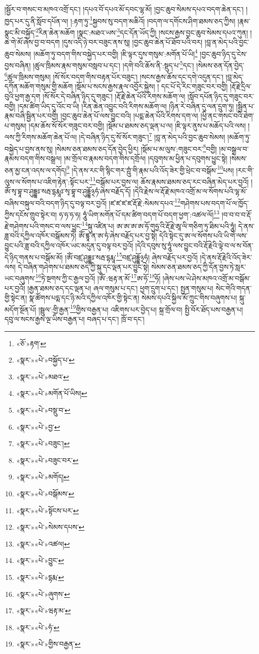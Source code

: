 །སྦྱོར་བ་གསང་བ་མཁའ་འགྲོ་དང་། །དཔའ་བོ་དཔའ་མོ་དབང་ལྷ་མོ། །བྱང་ཆུབ་སེམས་དཔའ་བདག་ཆེན་དང་། །ཁྱད་པར་དུ་ནི་སློབ་དཔོན་ལ། །:རྟག་ཏུ་\footnote{«ཅོ་»རྟག་}སྐྱབས་སུ་བདག་མཆིའོ། །བདག་ལ་དགོངས་ཤིག་ཐམས་ཅད་ཀྱིས། །རྣམ་སྣང་མི་བསྐྱོད་\footnote{«སྣར་»«པེ་»བསྐྱོད་པ་}རིན་ཆེན་མཆོག །སྣང་:མཐའ་ཡས་\footnote{«སྣར་»«པེ་»མཐའ་}དང་དོན་ཡོད་ཀྱི། །སངས་རྒྱས་བྱང་ཆུབ་སེམས་དཔའ་ཀུན། །ཆེ་གེ་མོ་ཞེས་བྱ་བ་བདག །དུས་འདི་ཉེ་བར་བཟུང་ནས་སུ། །བྱང་ཆུབ་ཆེན་པོ་ཐོབ་པའི་བར། །བླ་ན་མེད་པའི་བྱང་ཆུབ་སེམས། །མཆོག་ཏུ་བདག་གིས་བསྐྱེད་པར་བགྱི། །ཇི་ལྟར་དུས་གསུམ་:མགོན་པོ་ཡི།\footnote{«སྣར་»«པེ་»མགོན་པོ་ཡིས།} །བྱང་ཆུབ་ཉིད་དུ་ངེས་བྱས་བཞིན། །ཚུལ་ཁྲིམས་རྣམ་གསུམ་བསླབ་པ་དང་། །དགེ་བའི་ཆོས་ནི་:སྡུད་པ་\footnote{«སྣར་»«པེ་»བསྡུ་བ་}དང་། །སེམས་ཅན་དོན་བྱེད་\footnote{«སྣར་»«པེ་»བྱ་}ཚུལ་ཁྲིམས་གསུམ། །སོ་སོར་བདག་གིས་བརྟན་པོར་བཟུང་། །སངས་རྒྱས་ཆོས་དང་དགེ་འདུན་དང་། །བླ་མེད་དཀོན་མཆོག་གསུམ་གྱི་མཆོག །སྡོམ་པ་སངས་རྒྱས་རྣལ་འབྱོར་སྐྱེས། །
དང་པོ་དེ་རིང་གཟུང་བར་བགྱི། །རྡོ་རྗེ་དྲིལ་བུའི་ཕྱག་རྒྱ་དག །སོ་སོར་དེ་བཞིན་ཉིད་དུ་གཟུང་། །རྡོ་རྗེ་ཆེན་པོའི་རིགས་མཆོག་ལ། །སློབ་དཔོན་ཉིད་དུ་གཟུང་བར་བགྱི། །དམ་ཚིག་ཡིད་དུ་འོང་བ་ཡི། །རིན་ཆེན་འབྱུང་བའི་རིགས་མཆོག་ལ། །ཉིན་རེ་བཞིན་དུ་ལན་དྲུག་ཏུ། །སྦྱིན་པ་རྣམ་བཞི་སྦྱིན་པར་བགྱི། །བྱང་ཆུབ་ཆེན་པོ་ལས་བྱུང་བའི། །པདྨ་ཆེན་པོའི་རིགས་དག་ལ། །ཕྱི་ནང་གསང་བའི་ཐེག་པ་གསུམ། །དམ་ཆོས་སོ་སོར་གཟུང་བར་བགྱི། །སྡོམ་པ་ཐམས་ཅད་ལྡན་པ་ལ། །ཇི་ལྟར་ནུས་པ་མཆོད་པའི་ལས། །ལས་ཀྱི་རིགས་མཆོག་ཆེན་པོ་ལ། །དེ་བཞིན་ཉིད་དུ་སོ་སོར་གཟུང་།\footnote{«སྣར་»«པེ་»བཟུང་།} །བླ་ན་མེད་པའི་བྱང་ཆུབ་སེམས། །མཆོག་ཏུ་བསྐྱེད་པ་བྱས་ནས་སུ། །སེམས་ཅན་ཐམས་ཅད་དོན་བྱེད་ཕྱིར། །སྡོམ་པ་མ་ལུས་:གཟུང་བར་\footnote{«སྣར་»«པེ་»བཟུང་བར་}བགྱི། །མ་བསྒྲལ་བ་རྣམས་བདག་གིས་བསྒྲལ། །མ་གྲོལ་བ་རྣམས་བདག་གིས་དགྲོལ། །དབུགས་མ་ཕྱིན་པ་དབུགས་ཕྱུང་སྟེ། །སེམས་ཅན་མྱ་ངན་འདས་ལ་དགོད།\footnote{«སྣར་»«པེ་»མགོད།} །དེ་ནས་རང་གི་སྙིང་གར་ཀྵུཾ་གི་རྣམ་པའི་འོད་ཟེར་གྱི་ཕྲེང་བ་བསྒོམ་\footnote{«སྣར་»«པེ་»བསྒོམས་}པས། །རང་གི་ལུས་ལ་སོགས་པ་འཇིག་རྟེན་:སྟོང་པར་\footnote{«སྣར་»«པེ་»སྟོངས་པར་}བསྒོམ་པར་བྱས་ལ། ཆོས་རྣམས་ཐམས་ཅད་རང་བཞིན་མེད་པར་བྱའོ། །ཨོཾ་སྭ་བྷཱ་བ་ཤུདྡྷཿ་སརྦ་དྷརྨཱཿ་སྭ་བྷཱ་བ་ཤུདྡྷོ྅ཧཾ་ཞེས་བརྗོད་དོ། །དེའི་རྗེས་ལ་རྡོ་རྗེ་མཁའ་འགྲོ་མ་ལ་སོགས་པའི་ལྷ་མོ་བཞིས་བསྐུལ་བའི་བདག་ཉིད་དུ་བལྟ་བར་བྱའོ། །ཛ་ཛ་ཛ་ཛ་རྡོ་རྗེ་:སེམས་དཔའ་\footnote{«སྣར་»«པེ་»སེམས་དཔས་}གཤེགས་པས་བདག་པོ་ལ་ཁྱོད་ཀྱིས་དངོས་གྲུབ་སྟེར་བ། ཧ་ཧ་ཧ་ཧ། ཧཱུཾ་ཡིག་མགོན་པོ་དམ་ཚིག་བདག་པོ་བདག་ཕྱག་:འཚལ་ལོ།\footnote{«སྣར་»«པེ་»འཚལ།} །བ་བ་བ་བ་རྡོ་རྗེ་གཤེགས་པའི་གསང་བ་ལས་ཕྱུང་\footnote{«སྣར་»«པེ་»བྱུང་}སྐུ་འཛིན་པ། ཨ་ཨ་ཨ་ཨ་ཧོ་གུཧྱ་འི་རྡོ་རྗེ་ཨཱ་ལི་གཅིག་ཏུ་ཐིམ་པའི་ཧཱུཾ། དེ་ནས་ཟླ་བའི་དཀྱིལ་འཁོར་བསྒོམས་ཏེ། ཨོཾ་ཛྙཱ་ན་ཨ་ཧཾ་ཞེས་བརྗོད་པར་བྱ་སྟེ། དེའི་སྟེང་དུ་ཨ་ལ་སོགས་པའི་ཡི་གེ་ལས་བྱུང་པའི་ཟླ་བའི་དཀྱིལ་འཁོར་ཡང་མདུན་དུ་བལྟ་བར་བྱའོ། །དེའི་དབུས་སུ་ཧཱུཾ་ལས་བྱུང་བའི་རྡོ་རྗེའི་ལྟེ་བ་ལ་ས་བོན་དེ་ཉིད་གནས་པ་བསྒོམ་མོ། །ཨོཾ་བཛྲ་ཤུདྡྷཿ་སརྦ་དྷརྨཱ་\footnote{«སྣར་»«པེ་»དྷརྨ་}བཛྲ་ཤུདྡྷོ྅ཧཾ། ཞེས་བརྗོད་པར་བྱའོ། །དེ་ནས་རྡོ་རྗེའི་འོད་ཟེར་ལས། དེ་བཞིན་གཤེགས་པ་ཐམས་ཅད་ཀྱི་སྐུ་དང་ལྡན་པར་བྱུང་སྟེ། སེམས་ཅན་ཐམས་ཅད་ཀྱི་དོན་བྱས་ཏེ་སླར་ཡང་བཞུགས་\footnote{«སྣར་»«པེ་»ཞུགས་}ཏེ་སྔགས་ཀྱི་ང་རྒྱལ་བྱའོ། །ཨོཾ་:ཝརྟ་ན་མོ་\footnote{«སྣར་»«པེ་»ཝརྟ་མ་}ཨ་ཧོ་\footnote{«སྣར་»«པེ་»ཧཾ་}ཧོ། །ཞེས་པས་ཡེ་ཤེས་མཁའ་འགྲོ་མ་བསྒོམ་པར་བྱའོ། །རྒྱན་ཐམས་ཅད་དང་ལྡན་པ། ཞལ་གསུམ་པ་དང་། ཕྱག་དྲུག་པ་དང་། སྤྱན་གསུམ་པ། སེང་གེའི་གདན་གྱི་སྟེང་ན། སྣ་ཚོགས་པདྨ་དང་ཉི་མའི་དཀྱིལ་འཁོར་གྱི་སྟེང་ན། སེམས་དཔའི་སྐྱིལ་མོ་ཀྲུང་གིས་བཞུགས་པ། སྐུ་མདོག་སྔོན་པོ། །སྦྲུལ་:གྱི་རྒྱན་\footnote{«སྣར་»«པེ་»གྱིས་བརྒྱན་}གྱིས་བརྒྱན་པ། འཇིགས་པར་བྱེད་པ། སྐྲ་གྲོལ་བ། སྤྱི་བོར་ཐོད་པས་བརྒྱན་པ། དབུ་ལ་སངས་རྒྱས་ལྔ་ཡིས་བརྒྱན་པ། བཞད་པ་དང་། ཁྲོ་བ་དང་། 